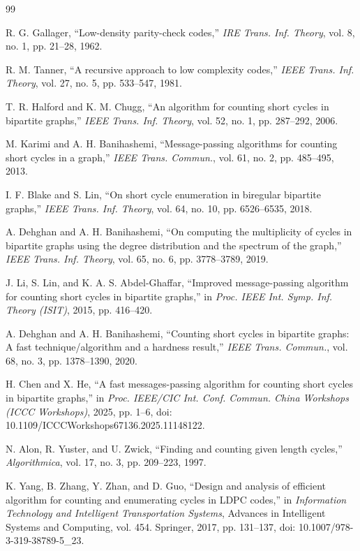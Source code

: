 \documentclass[conference]{IEEEtran}
\begin{document}
\begin{thebibliography}{99}

R. G. Gallager, ``Low-density parity-check codes,''
\emph{IRE Trans. Inf. Theory}, vol. 8, no. 1,
pp. 21--28, 1962.

R. M. Tanner, ``A recursive approach to low complexity codes,''
\emph{IEEE Trans. Inf. Theory}, vol. 27, no. 5,
pp. 533--547, 1981.

T. R. Halford and K. M. Chugg,
``An algorithm for counting short cycles in bipartite graphs,''
\emph{IEEE Trans. Inf. Theory}, vol. 52, no. 1,
pp. 287--292, 2006.

M. Karimi and A. H. Banihashemi,
``Message-passing algorithms for counting short cycles in a graph,''
\emph{IEEE Trans. Commun.}, vol. 61, no. 2,
pp. 485--495, 2013.

I. F. Blake and S. Lin,
``On short cycle enumeration in biregular bipartite graphs,''
\emph{IEEE Trans. Inf. Theory}, vol. 64, no. 10,
pp. 6526--6535, 2018.

A. Dehghan and A. H. Banihashemi,
``On computing the multiplicity of cycles in bipartite graphs
using the degree distribution and the spectrum of the graph,''
\emph{IEEE Trans. Inf. Theory}, vol. 65, no. 6,
pp. 3778--3789, 2019.

J. Li, S. Lin, and K. A. S. Abdel-Ghaffar,
``Improved message-passing algorithm for counting short cycles
in bipartite graphs,''
in \emph{Proc. IEEE Int. Symp. Inf. Theory (ISIT)},
2015, pp. 416--420.

A. Dehghan and A. H. Banihashemi,
``Counting short cycles in bipartite graphs:
A fast technique/algorithm and a hardness result,''
\emph{IEEE Trans. Commun.}, vol. 68, no. 3,
pp. 1378--1390, 2020.

H. Chen and X. He,
``A fast messages-passing algorithm for counting short cycles
in bipartite graphs,''
in \emph{Proc. IEEE/CIC Int. Conf. Commun. China Workshops
(ICCC Workshops)}, 2025, pp. 1--6,
doi: 10.1109/ICCCWorkshops67136.2025.11148122.

N. Alon, R. Yuster, and U. Zwick,
``Finding and counting given length cycles,''
\emph{Algorithmica}, vol. 17, no. 3,
pp. 209--223, 1997.

K. Yang, B. Zhang, Y. Zhan, and D. Guo,
``Design and analysis of efficient algorithm for counting
and enumerating cycles in LDPC codes,''
in \emph{Information Technology and Intelligent Transportation Systems},
Advances in Intelligent Systems and Computing, vol. 454.
Springer, 2017, pp. 131--137,
doi: 10.1007/978-3-319-38789-5\_23.


\end{thebibliography}
\end{document}
